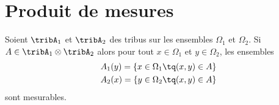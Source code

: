		\section{Produit de mesures}

		\begin{lemma} \label{LemAQmWEmN}
		Soient \( \tribA_1\) et \( \tribA_2\) des tribus sur les ensembles \( \Omega_1\) et \( \Omega_2\). Si \( A\in\tribA_1\otimes\tribA_2\) alors pour tout \( x\in \Omega_1\) et \( y\in\Omega_2\), les ensembles
		\begin{subequations}    \label{subEqCTtPccK}
		\begin{align}
		A_1(y)=\{ x\in\Omega_1\tq (x,y)\in A \} \\
					 A_2(x)=\{ y\in\Omega_2\tq (x,y)\in A \}
					 \end{align}
					 \end{subequations}
					 sont mesurables.
					 \end{lemma}

